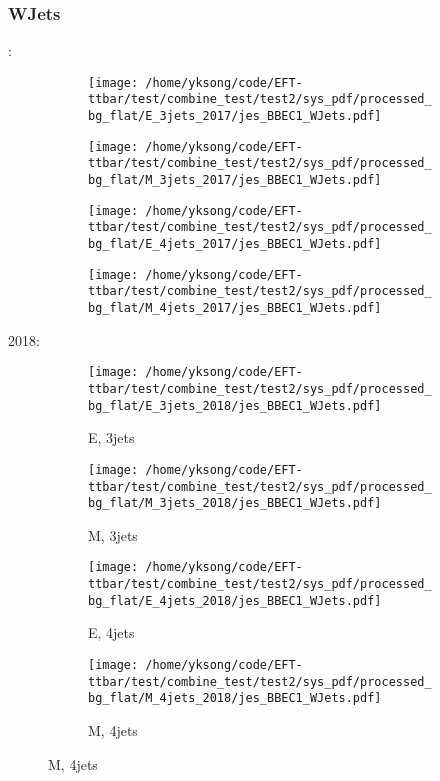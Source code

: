 \documentclass{beamer}
\begin{document}
\begin{frame}
\frametitle{WJets}
\fontsize{5}{1}:
\begin{figure}
\centering
\begin{subfigure}[b]{0.24\textwidth}
\texttt{[image: /home/yksong/code/EFT-ttbar/test/combine\_test/test2/sys\_pdf/processed\_bg\_flat/E\_3jets\_2017/jes\_BBEC1\_WJets.pdf]}
\end{subfigure}
\begin{subfigure}[b]{0.24\textwidth}
\texttt{[image: /home/yksong/code/EFT-ttbar/test/combine\_test/test2/sys\_pdf/processed\_bg\_flat/M\_3jets\_2017/jes\_BBEC1\_WJets.pdf]}
\end{subfigure}
\begin{subfigure}[b]{0.24\textwidth}
\texttt{[image: /home/yksong/code/EFT-ttbar/test/combine\_test/test2/sys\_pdf/processed\_bg\_flat/E\_4jets\_2017/jes\_BBEC1\_WJets.pdf]}
\end{subfigure}
\begin{subfigure}[b]{0.24\textwidth}
\texttt{[image: /home/yksong/code/EFT-ttbar/test/combine\_test/test2/sys\_pdf/processed\_bg\_flat/M\_4jets\_2017/jes\_BBEC1\_WJets.pdf]}
\end{subfigure}
\end{figure}
2018:
\begin{figure}
\centering
\begin{subfigure}[b]{0.24\textwidth}
\texttt{[image: /home/yksong/code/EFT-ttbar/test/combine\_test/test2/sys\_pdf/processed\_bg\_flat/E\_3jets\_2018/jes\_BBEC1\_WJets.pdf]}
\captionsetup{font=tiny}
\caption{E, 3jets}
\end{subfigure}
\begin{subfigure}[b]{0.24\textwidth}
\texttt{[image: /home/yksong/code/EFT-ttbar/test/combine\_test/test2/sys\_pdf/processed\_bg\_flat/M\_3jets\_2018/jes\_BBEC1\_WJets.pdf]}
\captionsetup{font=tiny}
\caption{M, 3jets}
\end{subfigure}
\begin{subfigure}[b]{0.24\textwidth}
\texttt{[image: /home/yksong/code/EFT-ttbar/test/combine\_test/test2/sys\_pdf/processed\_bg\_flat/E\_4jets\_2018/jes\_BBEC1\_WJets.pdf]}
\captionsetup{font=tiny}
\caption{E, 4jets}
\end{subfigure}
\begin{subfigure}[b]{0.24\textwidth}
\texttt{[image: /home/yksong/code/EFT-ttbar/test/combine\_test/test2/sys\_pdf/processed\_bg\_flat/M\_4jets\_2018/jes\_BBEC1\_WJets.pdf]}
\captionsetup{font=tiny}
\caption{M, 4jets}
\end{subfigure}
\end{figure}
\end{frame}
\end{document}
